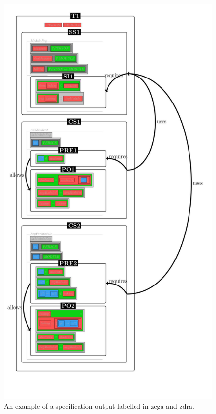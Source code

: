 \begin{figure}[H]
\begin{minipage}{0.45\textwidth}
\begin{tiny}
\begin{BVerbatim}[commandchars=+\[\]]
\end{BVerbatim}
\end{tiny}
\includegraphics[scale=0.75]{Figures/fullexample/1n2.jpg}
\caption{An example of a specification output labelled in \gls{zcga} and \gls{zdra}.\label{fig:zdrazcgaout}}
\end{minipage}
\end{figure}

